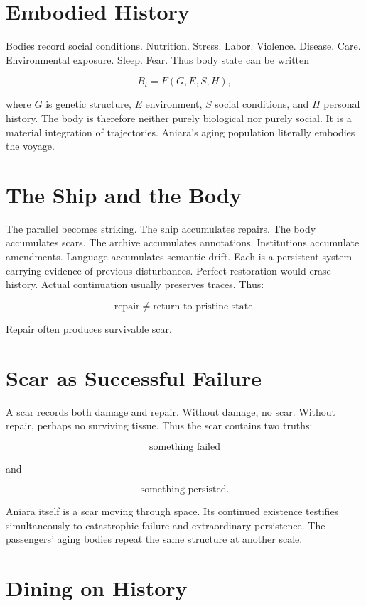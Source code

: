 \documentclass[11pt,oneside]{book}
\theoremstyle{definition}
\theoremstyle{remark}
\begin{document}
\section{Embodied History}

Bodies record social conditions. Nutrition. Stress. Labor. Violence. Disease. Care. Environmental
exposure. Sleep. Fear. Thus body state can be written

\[
B_t = F(G,E,S,H),
\]

where \(G\) is genetic structure, \(E\) environment, \(S\) social conditions, and \(H\) personal
history. The body is therefore neither purely biological nor purely social. It is a material
integration of trajectories. Aniara's aging population literally embodies the voyage.

\section{The Ship and the Body}

The parallel becomes striking. The ship accumulates repairs. The body accumulates scars. The archive
accumulates annotations. Institutions accumulate amendments. Language accumulates semantic drift.
Each is a persistent system carrying evidence of previous disturbances. Perfect restoration would
erase history. Actual continuation usually preserves traces. Thus:

\[
\text{repair} \neq \text{return to pristine state}.
\]

Repair often produces survivable scar.

\section{Scar as Successful Failure}

A scar records both damage and repair. Without damage, no scar. Without repair, perhaps no surviving
tissue. Thus the scar contains two truths:

\[
\text{something failed}
\]

and

\[
\text{something persisted}.
\]

Aniara itself is a scar moving through space. Its continued existence testifies simultaneously to
catastrophic failure and extraordinary persistence. The passengers' aging bodies repeat the same
structure at another scale.

\section{Dining on History}
\end{document}
